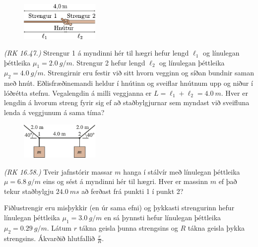 \begin{enumerate}[label = \textbf{Dæmi \thechapter.\arabic*.}]
\begin{minipage}{\linewidth}

\begin{figure}
\vspace{-0.5cm}
\includegraphics[width = 1.5in]{figures/strengur12.pdf}
\end{figure}

\item \textit{(RK 16.47.)} Strengur 1 á myndinni hér til hægri hefur lengd $\ell_1$ og línulegan þéttleika $\mu_1 = \SI{2.0}{g/m}$. Strengur 2 hefur lengd $\ell_2$ og línulegan þéttleika $\mu_2 = \SI{4.0}{g/m}$. Strengirnir eru festir við sitt hvorn vegginn og síðan bundnir saman með hnút. Eðlisfræðinemandi heldur í hnútinn og sveiflar hnútnum upp og niður í lóðrétta stefnu. Vegalengdin á milli veggjanna er $L = \ell_1 + \ell_2 = \SI{4.0}{m}$. Hver er lengdin á hvorum streng fyrir sig ef að staðbylgjurnar sem myndast við sveifluna lenda á veggjunum á sama tíma?
\end{minipage}

\begin{minipage}{\linewidth}
\begin{figure}
\vspace{-1cm}
\includegraphics[width = 1.5in]{figures/hanger.pdf}
\end{figure}

\item \textit{(RK 16.58.)} Tveir jafnstórir massar $m$ hanga í stálvír með línulegan þéttleika $\mu = \SI{6.8}{g/m}$ eins og sést á myndinni hér til hægri. Hver er massinn $m$ ef það tekur staðbylgju $\SI{24.0}{ms}$ að ferðast frá punkti 1 í punkt 2?
\end{minipage}

\item Fiðlustrengir eru misþykkir (en úr sama efni) og þykkasti strengurinn hefur línulegan þéttleika $\mu_{1} = \SI{3.0}{g/m}$ en sá þynnsti hefur línulegan þéttleika $\mu_{2} = \SI{0.29}{g/m}$. Látum $r$ tákna geisla þunna strengsins og $R$ tákna geisla þykka strengsins. Ákvarðið hlutfallið $\frac{r}{R}$.



\end{enumerate}
